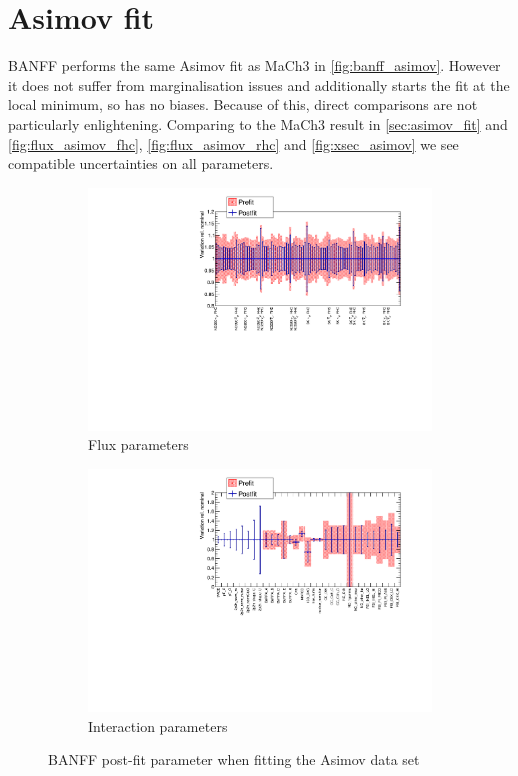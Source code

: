 \section{Asimov fit}
BANFF performs the same Asimov fit as MaCh3 in \autoref{fig:banff_asimov}. However it does not suffer from marginalisation issues and additionally starts the fit at the local minimum, so has no biases. Because of this, direct comparisons are not particularly enlightening. Comparing to the MaCh3 result in \autoref{sec:asimov_fit} and \autoref{fig:flux_asimov_fhc}, \autoref{fig:flux_asimov_rhc} and \autoref{fig:xsec_asimov} we see compatible uncertainties on all parameters.
\begin{figure}[h]
	\begin{subfigure}[t]{0.49\textwidth}
		\includegraphics[width=\textwidth, trim={10mm 17mm 15mm 0mm}, clip, page=1]{figures/mach3/banff/asimov_banff_flux}
		\caption{Flux parameters}
	\end{subfigure}
	\begin{subfigure}[t]{0.49\textwidth}
		\includegraphics[width=\textwidth, trim={10mm 15mm 15mm 0mm}, clip, page=1]{figures/mach3/banff/asimov_banff_xsec}
		\caption{Interaction parameters}
	\end{subfigure}
	\caption{BANFF post-fit parameter when fitting the Asimov data set}
	\label{fig:banff_asimov}
\end{figure}

